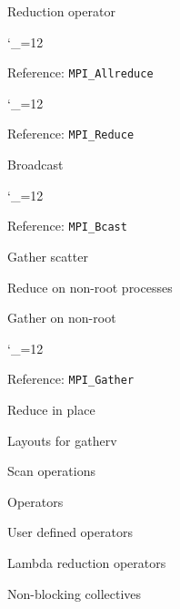 \documentclass[11pt,headernav]{beamer}
\newcommand\referenceframe{\begingroup\catcode`\_=12 \referenceframett}
\gdef\referenceframett#1{
  \begin{numberedframe}{Reference: \texttt{MPI_#1}}
    \small
    
  \end{numberedframe}\endgroup}
\begin{document}
\begin{numberedframe}{Reduction operator}
  
\end{numberedframe}
\referenceframe{Allreduce}
\referenceframe{Reduce}
\begin{numberedframe}{Broadcast}
  
\end{numberedframe}
\referenceframe{Bcast}
\begin{numberedframe}{Gather scatter}
  
\end{numberedframe}
\begin{numberedframe}{Reduce on non-root processes}
  \footnotesize
  
\end{numberedframe}
\begin{numberedframe}{Gather on non-root}
  
\end{numberedframe}
\referenceframe{Gather}
\begin{numberedframe}{Reduce in place}
  \footnotesize
  
\end{numberedframe}
\begin{numberedframe}{Layouts for gatherv}
  
\end{numberedframe}
\begin{numberedframe}{Scan operations}
  
\end{numberedframe}

\begin{exerciseframe}[scangather]
  
\end{exerciseframe}
\begin{exerciseframe}[scangather]
  
\end{exerciseframe}

\begin{numberedframe}{Operators}
  
\end{numberedframe}
\begin{numberedframe}{User defined operators}
  
\end{numberedframe}
\begin{numberedframe}{Lambda reduction operators}
  
\end{numberedframe}
\begin{numberedframe}{Non-blocking collectives}
  
\end{numberedframe}
\end{document}
